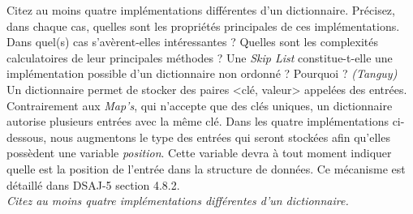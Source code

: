 Citez au moins quatre implémentations différentes d'un dictionnaire.
Précisez, dans chaque cas, quelles sont les propriétés principales de ces implémentations.
Dans quel(s) cas s'avèrent-elles intéressantes ?
Quelles sont les complexités calculatoires de leur principales méthodes ?
Une \textit{Skip List} constitue-t-elle une implémentation possible d'un dictionnaire non ordonné ?
Pourquoi ? \textit{(Tanguy)}
\\

Un dictionnaire permet de stocker des paires <clé, valeur> appelées des entrées.
Contrairement aux \textit{Map's}, qui n'accepte que des clés uniques, un dictionnaire autorise plusieurs entrées avec la même clé.
Dans les quatre implémentations ci-dessous, nous augmentons le type des entrées qui seront stockées afin qu'elles possèdent une variable \textit{position}. Cette variable devra à tout moment indiquer quelle est la position de l'entrée dans la structure de données. Ce mécanisme est détaillé dans DSAJ-5 section 4.8.2.
\\
\textit{Citez au moins quatre implémentations différentes d'un dictionnaire.}

